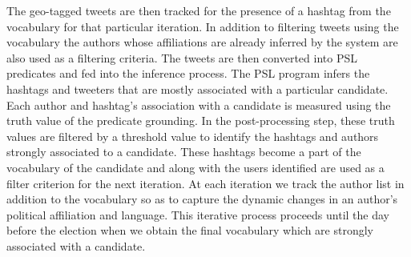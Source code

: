 The geo-tagged tweets are then tracked for the presence of a hashtag from the vocabulary for that particular iteration.
In addition to filtering tweets using the vocabulary the authors whose affiliations are already inferred by the system are also used as a filtering criteria.
The tweets are then converted into PSL predicates and fed into the inference process.
The PSL program infers the hashtags and tweeters that are mostly associated with a particular candidate. 
Each author and hashtag's association with a candidate is measured using the truth value of the predicate grounding.
In the post-processing step, these truth values are filtered by a threshold value to identify the hashtags and authors strongly associated to a candidate.
These hashtags become a part of the vocabulary of the candidate and along with the users identified are used as a filter criterion for the next iteration.
At each iteration we track the author list in addition to the vocabulary so as to capture the dynamic changes in an author's political affiliation and language.
This iterative process proceeds until the day before the election when we obtain the final vocabulary which are strongly associated with a candidate.

